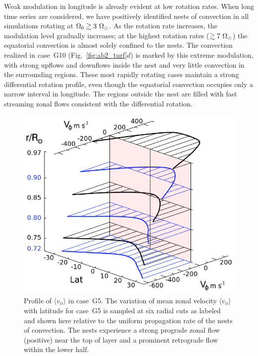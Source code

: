 Weak modulation in longitude is already evident at low rotation rates.
When long time series are considered, we have positively identified
nests of convection in all simulations rotating at 
$\Omega_0 \gtrsim 3~\Omega_\odot$.  As the rotation rate increases, the
modulation level gradually increases; at the highest rotation rates
($\gtrsim 7~\Omega_\odot$) the equatorial convection is almost solely
confined to the nests.  The convection realized in case~G10
(Fig.~\ref{fig:ab2_turf}$d$) is marked by this extreme modulation,
with strong upflows and downflows inside the nest and very little
convection in the surrounding regions.  These most rapidly rotating
cases maintain a strong differential rotation profile, even though the
equatorial convection occupies only a narrow interval in longitude.
The regions outside the nest are filled with fast streaming zonal
flows consistent with the differential rotation.



\begin{figure}[htbp]  
  \begin{center}
  \includegraphics[width=0.75\linewidth]{figs/chapter_3/Figure_4.eps}
  \end{center}
  \caption[Profile of $\langle v_\phi \rangle$ in case~G5]
	  {Profile of $\langle v_\phi \rangle$ in case~G5.
	  The variation of mean zonal velocity $\langle v_\phi \rangle$
	  with latitude for case~G5 is sampled at six radial cuts as labeled and
	  shown here relative to the uniform propagation rate of the nests of
	  convection.  The nests experience a strong prograde zonal flow
	  (positive) near the top of layer and a prominent retrograde flow
	  within the lower half.
  \label{fig:G5_patch_shear}}
\end{figure}


